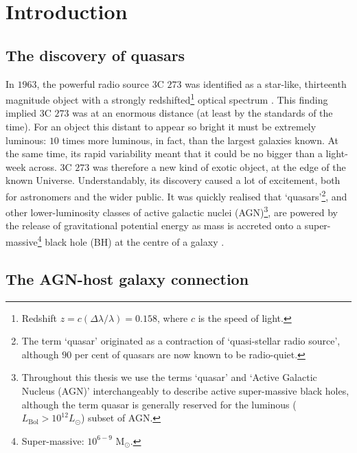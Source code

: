 
\chapter{Introduction}
\label{ch:intro}

\section{The discovery of quasars}

In $1963$, the powerful radio source $3$C $273$ was identified as a star-like, thirteenth magnitude object with a strongly redshifted\footnote{Redshift $z=c(\Delta \lambda/\lambda)=0.158$, where $c$ is the speed of light.} optical spectrum \citep{schmidt63}. 
This finding implied $3$C $273$ was at an enormous distance (at least by the standards of the time). 
For an object this distant to appear so bright it must be extremely luminous: $10$ times more luminous, in fact, than the largest galaxies known. 
At the same time, its rapid variability meant that it could be no bigger than a light-week across.
$3$C $273$ was therefore a new kind of exotic object, at the edge of the known Universe.   
Understandably, its discovery caused a lot of excitement, both for astronomers and the wider public.
It was quickly realised that `quasars'\footnote{The term `quasar' originated as a contraction of `quasi-stellar radio source', although $90$ per cent of quasars are now known to be radio-quiet.}, and other lower-luminosity classes of active galactic nuclei (AGN)\footnote{Throughout this thesis we use the terms `quasar' and `Active Galactic Nucleus (AGN)' interchangeably to describe active super-massive black holes, although the term quasar is generally reserved for the luminous ($L_{\text{Bol}} > 10^{12}L_{\odot}$) subset of AGN.}, are powered by the release of gravitational potential energy as mass is accreted onto a super-massive\footnote{Super-massive: $10^{6 - 9}$ M$_\odot$.} black hole (BH) at the centre of a galaxy \citep[e.g.][]{hoyle63,salpeter64,lynden-bell69,lynden-bell71}. 

\section{The AGN-host galaxy connection}


